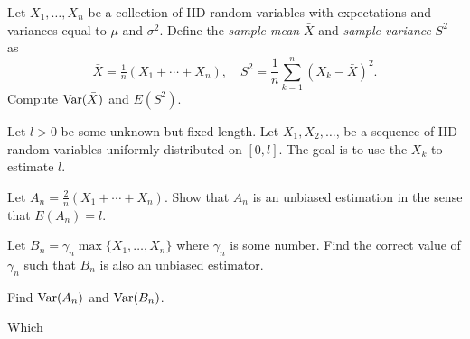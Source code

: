 \begin{problem}
  Let \(X_1,\dotsc,X_n\) be a collection of IID random variables with
  expectations and variances equal to \(\mu\) and \(\sigma^2\). Define the
  \emph{sample mean} \(\bar X\) and \emph{sample variance} \(S^2\) as
  \[
    \bar X=\tfrac{1}{n}(X_1+\dotsb+X_n),\quad
    S^2=\frac{1}{n}\sum_{k=1}^n(X_k-\bar X)^2.
  \]
  Compute \(\operatorname{Var}(\bar X)\) and \(E(S^2)\).
\end{problem}
\begin{solution*}
\end{solution*}

\begin{problem}
  Let \(l>0\) be some unknown but fixed length. Let \(X_1,X_2,\dotsc\), be
  a sequence of IID random variables uniformly distributed on
  \([0,l]\). The goal is to use the \(X_k\) to estimate \(l\).
  \begin{alphlist}
  \item Let \(A_n=\tfrac{2}{n}(X_1+\dotsb+X_n).\) Show that \(A_n\) is an
    unbiased estimation in the sense that \(E(A_n)=l\).
  \item Let \(B_n=\gamma_n\max\{X_1,\dotsc,X_n\}\) where \(\gamma_n\) is
    some number. Find the correct value of \(\gamma_n\) such that \(B_n\)
    is also an unbiased estimator.
  \item Find \(\operatorname{Var}(A_n)\) and \(\operatorname{Var}(B_n)\).
  \item Which
  \end{alphlist}
\end{problem}
\begin{solution*}
\end{solution*}

